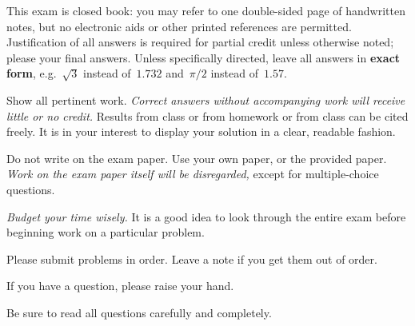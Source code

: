 This exam is closed book: you may refer to one double-sided page of handwritten notes, but no electronic aids or other
printed references are permitted. Justification of all answers is required
for partial credit unless otherwise noted; please  your final answers. Unless specifically directed, leave all answers in \textbf{exact form}, e.g.\ $\sqrt{3}$ instead of~$1.732$ and~$\pi/2$ instead of~$1.57$.

Show all pertinent work. \emph{Correct answers without accompanying work will receive little or no credit.} Results from class or from homework or from class can be cited freely. It is in your interest to display your solution in a
clear, readable fashion.

Do not write on the exam paper. Use your own paper, or the provided paper. \emph{Work on the exam paper itself will be disregarded,} except for multiple-choice questions.

\emph{Budget your time wisely.} It is a good idea to look through the entire exam before beginning work on a particular problem.

Please submit problems in order. Leave a note if you get them out of order.

If you have a question, please raise your hand.

Be sure to read all questions carefully and completely.